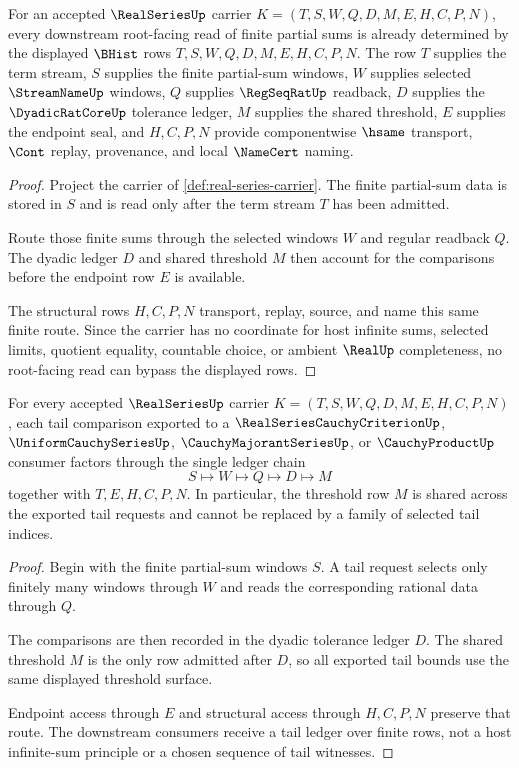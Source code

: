 \begin{theorem}
\label{thm:realseries-root-unblock-carrier}
For an accepted $\RealSeriesUp$ carrier $K=(T,S,W,Q,D,M,E,H,C,P,N)$, every downstream root-facing read of finite partial sums is already determined by the displayed $\BHist$ rows $T,S,W,Q,D,M,E,H,C,P,N$. The row $T$ supplies the term stream, $S$ supplies the finite partial-sum windows, $W$ supplies selected $\StreamNameUp$ windows, $Q$ supplies $\RegSeqRatUp$ readback, $D$ supplies the $\DyadicRatCoreUp$ tolerance ledger, $M$ supplies the shared threshold, $E$ supplies the endpoint seal, and $H,C,P,N$ provide componentwise $\hsame$ transport, $\Cont$ replay, provenance, and local $\NameCert$ naming.
\end{theorem}
\begin{proof}
Project the carrier of \autoref{def:real-series-carrier}. The finite partial-sum data is stored in $S$ and is read only after the term stream $T$ has been admitted.

Route those finite sums through the selected windows $W$ and regular readback $Q$. The dyadic ledger $D$ and shared threshold $M$ then account for the comparisons before the endpoint row $E$ is available.

The structural rows $H,C,P,N$ transport, replay, source, and name this same finite route. Since the carrier has no coordinate for host infinite sums, selected limits, quotient equality, countable choice, or ambient $\RealUp$ completeness, no root-facing read can bypass the displayed rows.
\end{proof}

\begin{theorem}
\label{thm:realseries-tail-ledger}
For every accepted $\RealSeriesUp$ carrier $K=(T,S,W,Q,D,M,E,H,C,P,N)$, each tail comparison exported to a $\RealSeriesCauchyCriterionUp$, $\UniformCauchySeriesUp$, $\CauchyMajorantSeriesUp$, or $\CauchyProductUp$ consumer factors through the single ledger chain
$$
S\longmapsto W\longmapsto Q\longmapsto D\longmapsto M
$$
together with $T,E,H,C,P,N$. In particular, the threshold row $M$ is shared across the exported tail requests and cannot be replaced by a family of selected tail indices.
\end{theorem}
\begin{proof}
Begin with the finite partial-sum windows $S$. A tail request selects only finitely many windows through $W$ and reads the corresponding rational data through $Q$.

The comparisons are then recorded in the dyadic tolerance ledger $D$. The shared threshold $M$ is the only row admitted after $D$, so all exported tail bounds use the same displayed threshold surface.

Endpoint access through $E$ and structural access through $H,C,P,N$ preserve that route. The downstream consumers receive a tail ledger over finite rows, not a host infinite-sum principle or a chosen sequence of tail witnesses.
\end{proof}

